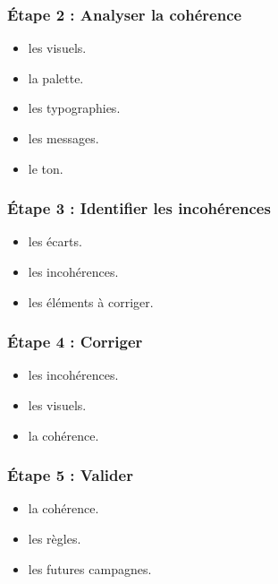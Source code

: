 \subsubsection{Étape 2 : Analyser la cohérence}

\begin{itemize}
    \item {} les visuels.
    \item {} la palette.
    \item {} les typographies.
    \item {} les messages.
    \item {} le ton.
\end{itemize}

\subsubsection{Étape 3 : Identifier les incohérences}

\begin{itemize}
    \item {} les écarts.
    \item {} les incohérences.
    \item {} les éléments à corriger.
\end{itemize}

\subsubsection{Étape 4 : Corriger}

\begin{itemize}
    \item {} les incohérences.
    \item {} les visuels.
    \item {} la cohérence.
\end{itemize}

\subsubsection{Étape 5 : Valider}

\begin{itemize}
    \item {} la cohérence.
    \item {} les règles.
    \item {} les futures campagnes.
\end{itemize}

